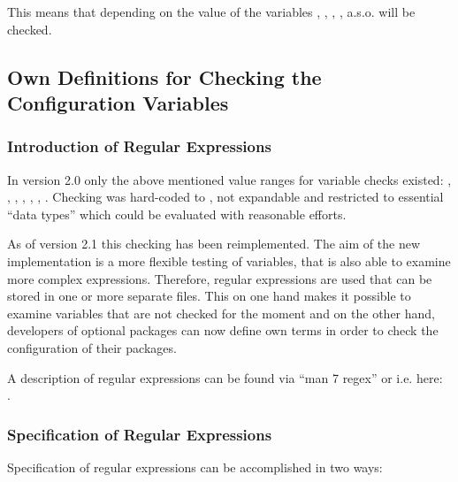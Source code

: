       This means that depending on the value of  the variables ,
      , , , a.s.o.
      will be checked.

\subsection{Own Definitions for Checking the Configuration Variables}

\subsubsection{Introduction of Regular Expressions}

  In version 2.0 only the above mentioned value ranges for variable checks existed:
  , , , , , ,
  . Checking was hard-coded to , not expandable and
  restricted to essential ``data types'' which could be evaluated with reasonable
  efforts.

  As of version 2.1 this checking has been reimplemented. The aim of the
  new implementation is a more flexible testing of variables, that is also
  able to examine more complex expressions. Therefore, regular expressions
  are used that can be stored in one or more separate files. This on one hand
  makes it possible to examine variables that are not checked for the moment and
  on the other hand, developers of optional packages can now define own terms in
  order to check the configuration of their packages.

  A description of regular expressions can be found via ``man 7 regex''
  or i.e. here:\\ .

\subsubsection{Specification of Regular Expressions}

  Specification of regular expressions can be accomplished in two ways:


